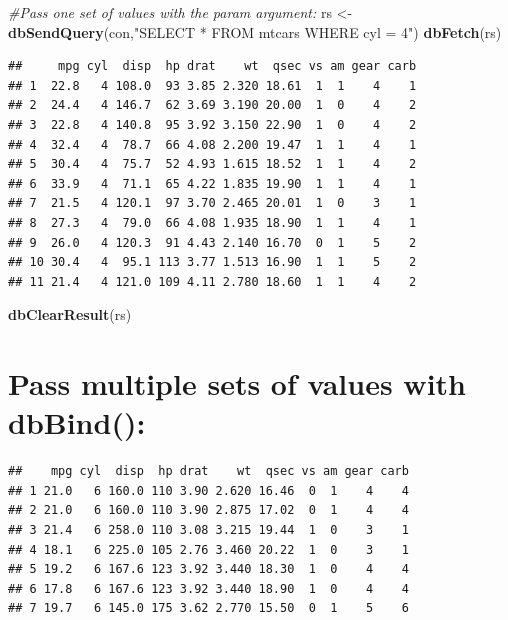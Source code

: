 \documentclass[]{book}
\newenvironment{Shaded}{\begin{snugshade}}{\end{snugshade}}
\newcommand{\CommentTok}[1]{\textcolor[rgb]{0.56,0.35,0.01}{\textit{#1}}}
\newcommand{\KeywordTok}[1]{\textcolor[rgb]{0.13,0.29,0.53}{\textbf{#1}}}
\newcommand{\NormalTok}[1]{#1}
\newcommand{\StringTok}[1]{\textcolor[rgb]{0.31,0.60,0.02}{#1}}
\theoremstyle{definition}
\theoremstyle{definition}
\theoremstyle{definition}
\theoremstyle{remark}
\begin{document}
\begin{Shaded}
\begin{Highlighting}[]
\CommentTok{#Pass one set of values with the param argument:}
\NormalTok{rs <-}\StringTok{ }\KeywordTok{dbSendQuery}\NormalTok{(con,}\StringTok{"SELECT * FROM mtcars WHERE cyl = 4"}\NormalTok{)}
\KeywordTok{dbFetch}\NormalTok{(rs)}
\end{Highlighting}
\end{Shaded}

\begin{verbatim}
##     mpg cyl  disp  hp drat    wt  qsec vs am gear carb
## 1  22.8   4 108.0  93 3.85 2.320 18.61  1  1    4    1
## 2  24.4   4 146.7  62 3.69 3.190 20.00  1  0    4    2
## 3  22.8   4 140.8  95 3.92 3.150 22.90  1  0    4    2
## 4  32.4   4  78.7  66 4.08 2.200 19.47  1  1    4    1
## 5  30.4   4  75.7  52 4.93 1.615 18.52  1  1    4    2
## 6  33.9   4  71.1  65 4.22 1.835 19.90  1  1    4    1
## 7  21.5   4 120.1  97 3.70 2.465 20.01  1  0    3    1
## 8  27.3   4  79.0  66 4.08 1.935 18.90  1  1    4    1
## 9  26.0   4 120.3  91 4.43 2.140 16.70  0  1    5    2
## 10 30.4   4  95.1 113 3.77 1.513 16.90  1  1    5    2
## 11 21.4   4 121.0 109 4.11 2.780 18.60  1  1    4    2
\end{verbatim}

\begin{Shaded}
\begin{Highlighting}[]
\KeywordTok{dbClearResult}\NormalTok{(rs)}
\end{Highlighting}
\end{Shaded}

\hypertarget{pass-multiple-sets-of-values-with-dbbind}{%
\section{Pass multiple sets of values with
dbBind():}\label{pass-multiple-sets-of-values-with-dbbind}}

\begin{Shaded}
\end{Shaded}

\begin{verbatim}
##    mpg cyl  disp  hp drat    wt  qsec vs am gear carb
## 1 21.0   6 160.0 110 3.90 2.620 16.46  0  1    4    4
## 2 21.0   6 160.0 110 3.90 2.875 17.02  0  1    4    4
## 3 21.4   6 258.0 110 3.08 3.215 19.44  1  0    3    1
## 4 18.1   6 225.0 105 2.76 3.460 20.22  1  0    3    1
## 5 19.2   6 167.6 123 3.92 3.440 18.30  1  0    4    4
## 6 17.8   6 167.6 123 3.92 3.440 18.90  1  0    4    4
## 7 19.7   6 145.0 175 3.62 2.770 15.50  0  1    5    6
\end{verbatim}
\end{document}
